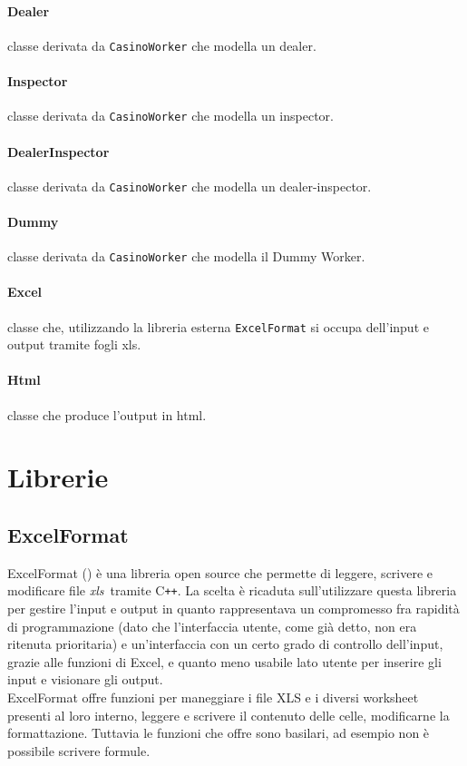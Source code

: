 \paragraph{Dealer} classe derivata da \texttt{CasinoWorker} che modella un dealer.
\paragraph{Inspector} classe derivata da \texttt{CasinoWorker} che modella un inspector.
\paragraph{DealerInspector} classe derivata da \texttt{CasinoWorker} che modella un dealer-inspector.
\paragraph{Dummy} classe derivata da \texttt{CasinoWorker} che modella il Dummy Worker.
\paragraph{Excel} classe che, utilizzando la libreria esterna \texttt{ExcelFormat} si occupa dell'input e output tramite fogli xls.
\paragraph{Html} classe che produce l'output in html.
\section{Librerie}
\subsection{ExcelFormat}
ExcelFormat () è una libreria open source che permette di leggere, scrivere e modificare file \emph{\gls{xls}}\glsfirstoccur\ tramite C\texttt{++}. La scelta è ricaduta sull'utilizzare questa libreria per gestire l'input e output in quanto rappresentava un compromesso fra rapidità di programmazione (dato che l'interfaccia utente, come già detto, non era ritenuta prioritaria) e un'interfaccia con un certo grado di controllo dell'input, grazie alle funzioni di Excel, e quanto meno usabile lato utente per inserire gli input e visionare gli output. \\
ExcelFormat offre funzioni per maneggiare i file XLS e i diversi worksheet presenti al loro interno, leggere e scrivere il contenuto delle celle, modificarne la formattazione. Tuttavia le funzioni che offre sono basilari, ad esempio non è possibile scrivere formule.
